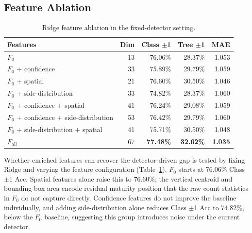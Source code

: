 ﻿\documentclass[conference]{IEEEtran}
\begin{document}
\subsection{Feature Ablation}
\label{sec:ablation}

\begin{table}[!htbp]
  \centering
  \scriptsize
  \setlength{\tabcolsep}{2.2pt}
  \caption{Ridge feature ablation in the fixed-detector setting.}
  \label{tab:ablation}
  \begin{tabular}{@{}>{\raggedright\arraybackslash}p{}rrrr@{}}
    \toprule
    Features                            & Dim & Class $\pm$1 & Tree $\pm$1 & MAE            \\
    \midrule
    $F_0$                                  &  13 & 76.06\%          & 28.37\%          & 1.053          \\
    $F_0$ + confidence                     &  33 & 75.89\%          & 29.79\%          & 1.059          \\
    $F_0$ + spatial                        &  21 & 76.60\%          & 30.50\%          & 1.046          \\
    $F_0$ + side-distribution              &  33 & 74.82\%          & 28.37\%          & 1.060          \\
    $F_0$ + confidence + spatial           &  41 & 76.24\%          & 29.08\%          & 1.059          \\
    $F_0$ + confidence + side-distribution &  53 & 76.42\%          & 29.79\%          & 1.060          \\
    $F_0$ + side-distribution + spatial    &  41 & 75.71\%          & 30.50\%          & 1.048          \\
    $F_{\text{all}}$                    &  67 & \textbf{77.48\%} & \textbf{32.62\%} & \textbf{1.035} \\
    \bottomrule
  \end{tabular}
\end{table}

Whether enriched features can recover the detector-driven gap is tested by
fixing Ridge and varying the feature configuration (Table~\ref{tab:ablation}).
$F_0$ starts at 76.06\% Class $\pm$1 Acc. Spatial features alone raise this to
76.60\%; the vertical centroid and bounding-box area encode residual maturity
position that the raw count statistics in $F_0$ do not capture directly.
Confidence features do not improve the baseline individually, and adding
side-distribution alone reduces Class $\pm$1 Acc to 74.82\%, below the $F_0$
baseline, suggesting this group introduces noise under the current detector.
\end{document}
